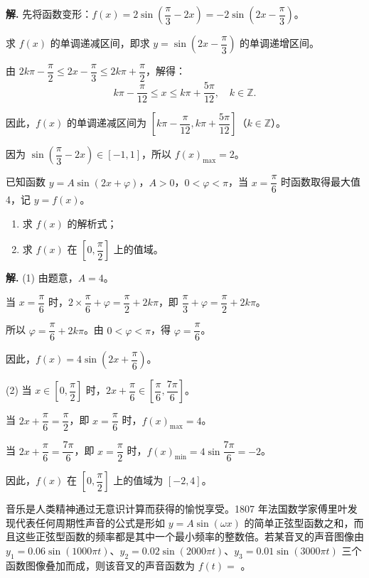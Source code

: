 \documentclass[11pt]{ctexrep}
\begin{document}
\textbf{解.} 先将函数变形：$f(x) = 2\sin\left(\dfrac{\pi}{3} - 2x\right) = -2\sin\left(2x - \dfrac{\pi}{3}\right)$。

求 $f(x)$ 的单调递减区间，即求 $y = \sin\left(2x - \dfrac{\pi}{3}\right)$ 的单调递增区间。

由 $2k\pi - \dfrac{\pi}{2} \leqslant 2x - \dfrac{\pi}{3} \leqslant 2k\pi + \dfrac{\pi}{2}$，解得：
\[
    k\pi - \frac{\pi}{12} \leqslant x \leqslant k\pi + \frac{5\pi}{12}, \quad k \in \mathbb{Z}.
\]

因此，$f(x)$ 的单调递减区间为 $\left[k\pi - \dfrac{\pi}{12}, k\pi + \dfrac{5\pi}{12}\right]$（$k \in \mathbb{Z}$）。

因为 $\sin\left(\dfrac{\pi}{3} - 2x\right) \in [-1, 1]$，所以 $f(x)_{\max} = 2$。

\begin{realexam}[2025 松江高三二模]
    已知函数 $y = A\sin(2x + \varphi)$，$A > 0$，$0 < \varphi < \pi$，当 $x = \dfrac{\pi}{6}$ 时函数取得最大值 4，记 $y = f(x)$。
    \begin{enumerate}
        \item 求 $f(x)$ 的解析式；
        \item 求 $f(x)$ 在 $\left[0, \dfrac{\pi}{2}\right]$ 上的值域。
    \end{enumerate}
\end{realexam}

\textbf{解.} (1) 由题意，$A = 4$。

当 $x = \dfrac{\pi}{6}$ 时，$2 \times \dfrac{\pi}{6} + \varphi = \dfrac{\pi}{2} + 2k\pi$，即 $\dfrac{\pi}{3} + \varphi = \dfrac{\pi}{2} + 2k\pi$。

所以 $\varphi = \dfrac{\pi}{6} + 2k\pi$。由 $0 < \varphi < \pi$，得 $\varphi = \dfrac{\pi}{6}$。

因此，$f(x) = 4\sin\left(2x + \dfrac{\pi}{6}\right)$。

(2) 当 $x \in \left[0, \dfrac{\pi}{2}\right]$ 时，$2x + \dfrac{\pi}{6} \in \left[\dfrac{\pi}{6}, \dfrac{7\pi}{6}\right]$。

当 $2x + \dfrac{\pi}{6} = \dfrac{\pi}{2}$，即 $x = \dfrac{\pi}{6}$ 时，$f(x)_{\max} = 4$。

当 $2x + \dfrac{\pi}{6} = \dfrac{7\pi}{6}$，即 $x = \dfrac{\pi}{2}$ 时，$f(x)_{\min} = 4\sin\dfrac{7\pi}{6} = -2$。

因此，$f(x)$ 在 $\left[0, \dfrac{\pi}{2}\right]$ 上的值域为 $[-2, 4]$。

\begin{realexam}[2026 奉贤高三二模]
    音乐是人类精神通过无意识计算而获得的愉悦享受。1807 年法国数学家傅里叶发现代表任何周期性声音的公式是形如 $y = A\sin(\omega x)$ 的简单正弦型函数之和，而且这些正弦型函数的频率都是其中一个最小频率的整数倍。若某音叉的声音图像由 $y_1 = 0.06\sin(1000\pi t)$、$y_2 = 0.02\sin(2000\pi t)$、$y_3 = 0.01\sin(3000\pi t)$ 三个函数图像叠加而成，则该音叉的声音函数为 $f(t) = $ \underline{\hspace{2cm}}。
\end{realexam}
\end{document}
